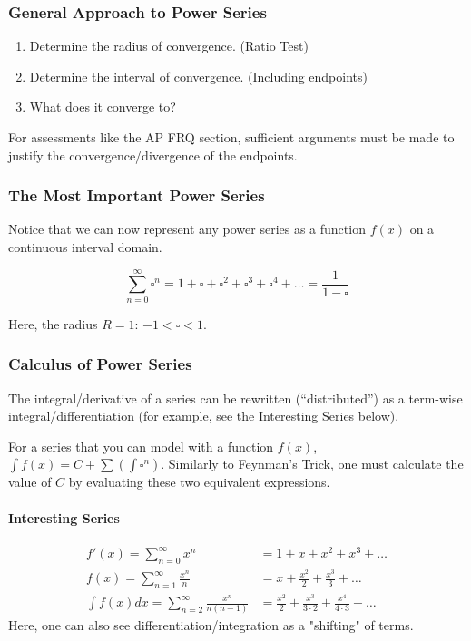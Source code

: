 \documentclass{article}
\begin{document}
\subsubsection{General Approach to Power Series}
\begin{enumerate}
    \item Determine the radius of convergence. (Ratio Test)
    \item Determine the interval of convergence. (Including endpoints)
    \item What does it converge to?
\end{enumerate}
For assessments like the AP FRQ section, sufficient arguments must be made to justify the convergence/divergence of the endpoints.

\subsubsection{The Most Important Power Series}
Notice that we can now represent any power series as a function $f(x)$ on a continuous interval domain.

$$\sum_{n=0}^{\infty} \square^n = 1 + \square + \square^2 + \square^3 + \square^4 + \ldots = \frac{1}{1-\square}$$

Here, the radius $R = 1$: $-1 < \square < 1$.

\subsubsection{Calculus of Power Series}
The integral/derivative of a series can be rewritten (``distributed'') as a term-wise integral/differentiation (for example, see the Interesting Series below).

For a series that you can model with a function $f(x)$, $\int f(x) = C + \sum \left(\int \square^n\right)$. Similarly to Feynman's Trick, one must calculate the value of $C$ by evaluating these two equivalent expressions.

\paragraph{Interesting Series}
\begin{align*}
    f'(x) = \sum_{n=0}^{\infty} x^n &= 1 + x + x^2 + x^3 + \ldots \\
    f(x) = \sum_{n=1}^{\infty} \frac{x^n}{n} &= x + \frac{x^2}{2} + \frac{x^3}{3} + \ldots \\
    \int f(x)dx = \sum_{n=2}^{\infty} \frac{x^n}{n(n-1)} &= \frac{x^2}{2} + \frac{x^3}{3 \cdot 2} + \frac{x^4}{4 \cdot 3} + \ldots
\end{align*}
Here, one can also see differentiation/integration as a "shifting" of terms.
\end{document}
